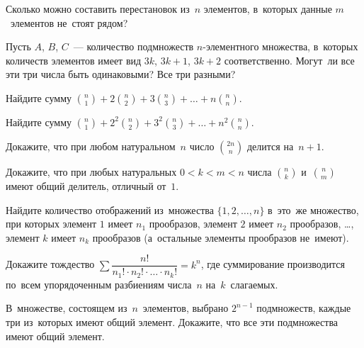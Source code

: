 \begin{problems}

\item
Сколько можно составить перестановок из~$n$ элементов, в~которых данные
$m$~элементов не~стоят рядом?

\item
Пусть $A$, $B$, $C$~--- количество подмножеств $n$-элементного множества,
в~которых количеств элементов имеет вид $3k$, $3k+1$, $3k+2$ соответственно.
Могут~ли все эти три числа быть одинаковыми?
Все три разными?

\item
Найдите сумму
\(
    \binom{n}{1} + 2 \binom{n}{2} + 3 \binom{n}{3}
    + \ldots +
    n \binom{n}{n}
\).

\item
Найдите сумму
\(
    \binom{n}{1} + 2^{2} \binom{n}{2} + 3^{2} \binom{n}{3}
    + \ldots +
    n^{2} \binom{n}{n}
\).

\item
Докажите, что при любом натуральном~$n$ число $\binom{2n}{n}$
делится на~$n + 1.$

\item
Докажите, что при любых натуральных $0 < k < m < n$ числа
$\binom{n}{k}$ и~$\binom{n}{m}$ имеют общий делитель, отличный от~$1$.

\item
Найдите количество отображений из~множества $\{1, 2, \ldots, n\}$ в~это~же
множество, при которых
элемент $1$ имеет $n_{1}$ прообразов,
элемент $2$ имеет $n_{2}$ прообразов, \ldots,
элемент $k$ имеет $n_{k}$ прообразов
(а~остальные элементы прообразов не~имеют).

\item
Докажите тождество
\(
    \sum
        \dfrac{n!}{n_{1}! \cdot n_{2}! \cdot \ldots \cdot n_{k}!}
=
    k^{n}
\),
где суммирование производится по~всем упорядоченным разбиениям числа~$n$
на~$k$~слагаемых.

\item
В~множестве, состоящем из~$n$~элементов, выбрано $2^{n-1}$ подмножеств, каждые
три из~которых имеют общий элемент.
Докажите, что все эти подмножества имеют общий элемент.

\end{problems}

\endgroup %

